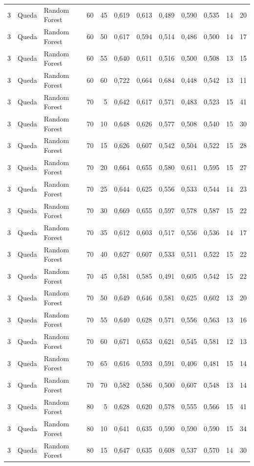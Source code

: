 \begin{longtable}{@{}rllrrrrrrrrr@{}}
3 & Queda & Random Forest & 60 & 45 & 0,619 & 0,613 & 0,489 & 0,590 & 0,535 & 14 & 20 \\
3 & Queda & Random Forest & 60 & 50 & 0,617 & 0,594 & 0,514 & 0,486 & 0,500 & 14 & 17 \\
3 & Queda & Random Forest & 60 & 55 & 0,640 & 0,611 & 0,516 & 0,500 & 0,508 & 13 & 15 \\
3 & Queda & Random Forest & 60 & 60 & 0,722 & 0,664 & 0,684 & 0,448 & 0,542 & 13 & 11 \\
3 & Queda & Random Forest & 70 & 5 & 0,642 & 0,617 & 0,571 & 0,483 & 0,523 & 15 & 41 \\
3 & Queda & Random Forest & 70 & 10 & 0,648 & 0,626 & 0,577 & 0,508 & 0,540 & 15 & 30 \\
3 & Queda & Random Forest & 70 & 15 & 0,626 & 0,607 & 0,542 & 0,504 & 0,522 & 15 & 28 \\
3 & Queda & Random Forest & 70 & 20 & 0,664 & 0,655 & 0,580 & 0,611 & 0,595 & 15 & 27 \\
3 & Queda & Random Forest & 70 & 25 & 0,644 & 0,625 & 0,556 & 0,533 & 0,544 & 14 & 23 \\
3 & Queda & Random Forest & 70 & 30 & 0,669 & 0,655 & 0,597 & 0,578 & 0,587 & 15 & 22 \\
3 & Queda & Random Forest & 70 & 35 & 0,612 & 0,603 & 0,517 & 0,556 & 0,536 & 14 & 17 \\
3 & Queda & Random Forest & 70 & 40 & 0,627 & 0,607 & 0,533 & 0,511 & 0,522 & 15 & 22 \\
3 & Queda & Random Forest & 70 & 45 & 0,581 & 0,585 & 0,491 & 0,605 & 0,542 & 15 & 22 \\
3 & Queda & Random Forest & 70 & 50 & 0,649 & 0,646 & 0,581 & 0,625 & 0,602 & 13 & 20 \\
3 & Queda & Random Forest & 70 & 55 & 0,640 & 0,628 & 0,571 & 0,556 & 0,563 & 13 & 16 \\
3 & Queda & Random Forest & 70 & 60 & 0,671 & 0,653 & 0,621 & 0,545 & 0,581 & 12 & 13 \\
3 & Queda & Random Forest & 70 & 65 & 0,616 & 0,593 & 0,591 & 0,406 & 0,481 & 15 & 14 \\
3 & Queda & Random Forest & 70 & 70 & 0,582 & 0,586 & 0,500 & 0,607 & 0,548 & 13 & 14 \\
3 & Queda & Random Forest & 80 & 5 & 0,628 & 0,620 & 0,578 & 0,555 & 0,566 & 15 & 41 \\
3 & Queda & Random Forest & 80 & 10 & 0,641 & 0,635 & 0,590 & 0,590 & 0,590 & 15 & 34 \\
3 & Queda & Random Forest & 80 & 15 & 0,647 & 0,635 & 0,608 & 0,537 & 0,570 & 14 & 30 \\

\end{longtable}
